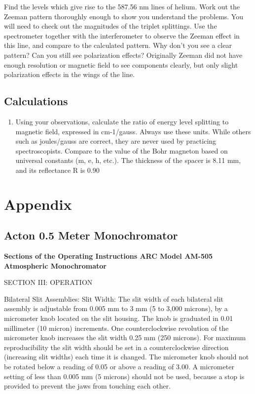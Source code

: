 \documentclass{../lab}
\begin{document}
\begin{enumerate}
    Find the levels which give rise to the 587.56 nm lines of helium. Work out the Zeeman pattern thoroughly enough to show you understand the problems. You will need to check out the magnitudes of the triplet splittings. Use the spectrometer together with the interferometer to observe the Zeeman effect in this line, and compare to the calculated pattern. Why don't you see a clear pattern? Can you still see polarization effects? Originally Zeeman did not have enough resolution or magnetic field to see components clearly, but only slight polarization effects in the wings of the line.

\end{enumerate}

\subsection{Calculations}

\begin{enumerate}
    \item Using your observations, calculate the ratio of energy level splitting to magnetic field, expressed in cm-1/gauss. Always use these units. While others such as joules/gauss are correct, they are never used by practicing spectroscopists. Compare to the value of the Bohr magneton based on universal constants (m, e, h, etc.). The thickness of the spacer is 8.11 mm, and its reflectance R is 0.90
\end{enumerate}

\section{Appendix}
\label{sec:Appendix}

\subsection{Acton 0.5 Meter Monochromator}

\textbf{Sections of the Operating Instructions ARC Model AM-505 Atmospheric Monochromator}

SECTION III: OPERATION

Bilateral Slit Assemblies: Slit Width: The slit width of each bilateral slit assembly is adjustable from 0.005 mm to 3 mm (5 to 3,000 microns), by a micrometer knob located on the slit housing. The knob is graduated in 0.01 millimeter (10 micron) increments. One counterclockwise revolution of the micrometer knob increases the slit width 0.25 mm (250 microns). For maximum reproducibility the slit width should be set in a counterclockwise direction (increasing slit widths) each time it is changed. The micrometer knob should not be rotated below a reading of 0.05 or above a reading of 3.00. A micrometer setting of less than 0.005 mm (5 microns) should not be used, because a stop is provided to prevent the jaws from touching each other.
\end{document}
